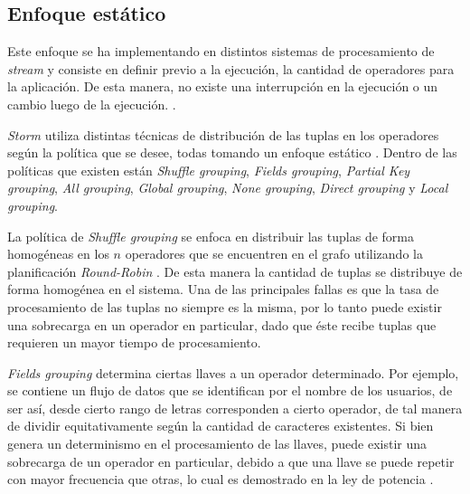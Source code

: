 \subsection{Enfoque estático}
\label{subsec:enfoqueEstaticoBC}
Este enfoque se ha implementando en distintos sistemas de procesamiento de \textsl{stream} y consiste en definir previo a la ejecución, la cantidad de operadores para la aplicación. De esta manera, no existe una interrupción en la ejecución o un cambio luego de la ejecución. \citep{CasavantK88}.


\textsl{Storm} utiliza distintas técnicas de distribución de las tuplas en los operadores según la política que se desee, todas tomando un enfoque estático \citep{stormtwitter}. Dentro de las políticas que existen están \textit{Shuffle grouping}, \textit{Fields grouping}, \textit{Partial Key grouping}, \textit{All grouping}, \textit{Global grouping}, \textit{None grouping}, \textit{Direct grouping} y \textit{Local grouping}.

La política de \textit{Shuffle grouping} se enfoca en distribuir las tuplas de forma homogéneas en los $n$ operadores que se encuentren en el grafo utilizando la planificación \textit{Round-Robin} \citep{bookScheduling}. De esta manera la cantidad de tuplas se distribuye de forma homogénea en el sistema. Una de las principales fallas es que la tasa de procesamiento de las tuplas no siempre es la misma, por lo tanto puede existir una sobrecarga en un operador en particular, dado que éste recibe tuplas que requieren un mayor tiempo de procesamiento.

\textit{Fields grouping} determina ciertas llaves a un operador determinado. Por ejemplo, se contiene un flujo de datos que se identifican por el nombre de los usuarios, de ser así, desde cierto rango de letras corresponden a cierto operador, de tal manera de dividir equitativamente según la cantidad de caracteres existentes. Si bien genera un determinismo en el procesamiento de las llaves, puede existir una sobrecarga de un operador en particular, debido a que una llave se puede repetir con mayor frecuencia que otras, lo cual es demostrado en la ley de potencia \citep{rushton2010handbook}.

